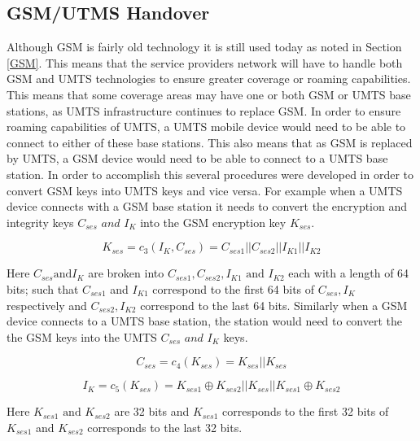 \documentclass{sig-alternate}
\begin{document}
	\subsection{GSM/UTMS Handover \label{Handover}}
	Although GSM is fairly old technology it is still used today as noted in Section \ref{GSM}. This means that the service providers network will have to handle both GSM and UMTS technologies to ensure greater coverage or roaming capabilities. This means that some coverage areas may have one or both GSM or UMTS base stations, as UMTS infrastructure continues to replace GSM. In order to ensure roaming capabilities of UMTS, a UMTS mobile device would need to be able to connect to either of these base stations. This also means that as GSM is replaced by UMTS, a GSM device would need to be able to connect to a UMTS base station. In order to accomplish this several procedures were developed in order to convert GSM keys into UMTS keys and vice versa. For example when a UMTS device connects with a GSM base station it needs to convert the encryption and integrity keys $\mathit{C_{ses}\text{ and } I_{K}}$ into the GSM encryption key $K_{ses}$.   

\begin{equation}
	\label{C_3}
	\mathit{K_{ses} = c_{3}(I_{K},C_{ses}) = C_{ses1}||C_{ses2}||I_{K1}||I_{K2}}
\end{equation}

Here $C_{ses} \text{and} I_{K} $ are broken into  $C_{ses1},C_{ses2},I_{K1}\text{ and }I_{K2}$ each with a length of 64 bits; such that $C_{ses1}$ and $I_{K1}$ correspond to the first 64 bits of $C_{ses},I_{K}$ respectively and $C_{ses2},I_{K2}$ correspond to the last 64 bits.
 Similarly when a GSM device connects to a UMTS base station, the station would need to convert the the GSM keys into the UMTS $\mathit{C_{ses} \text{ and } I_{K}}$ keys. 

\begin{equation} 
\label{C_4}
	\mathit{C_{ses} = c_{4}(K_{ses}) = K_{ses} || K_{ses}}
\end{equation}

\begin{equation}
\label{C_5}
	\mathit{I_{K} = c_{5}(K_{ses}) = K_{ses1}\oplus K_{ses2}||K_{ses}||K_{ses1}\oplus K_{ses2}}
\end{equation}

Here $K_{ses1} \text{ and } K_{ses2}$ are 32 bits and $K_{ses1}$ corresponds to the first 32 bits of $K_{ses1}$ and $K_{ses2}$ corresponds to the last 32 bits.
 
\end{document}
